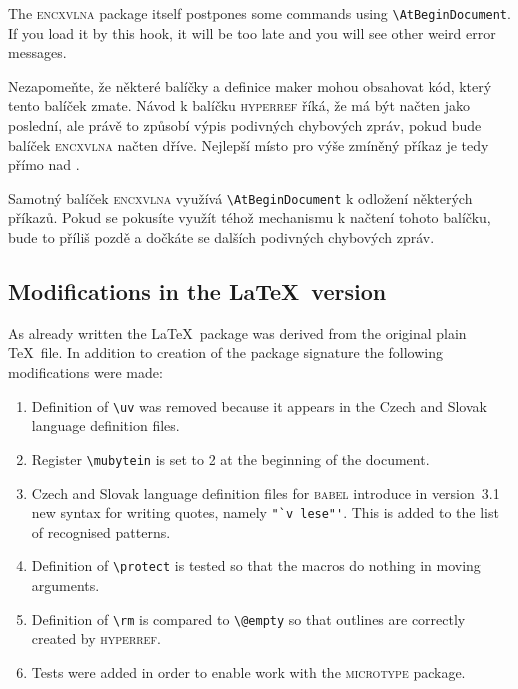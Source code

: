The \textsc{encxvlna} package itself postpones some commands using \verb;\AtBeginDocument;. If you load
it by this hook, it will be too late and you will see other weird error messages.

\else

Nezapomeňte, že některé balíčky a definice maker mohou obsahovat kód, který tento balíček zmate.
Návod k balíčku \textsc{hyperref} říká, že má být načten jako poslední, ale právě to způsobí výpis
podivných chybových zpráv, pokud bude balíček \textsc{encxvlna} načten dříve. Nejlepší místo pro výše
zmíněný příkaz je tedy přímo nad \verb;;.

Samotný balíček \textsc{encxvlna} využívá \verb;\AtBeginDocument; k odložení některých příkazů. Pokud
se pokusíte využít téhož mechanismu k načtení tohoto balíčku, bude to příliš pozdě a dočkáte se
dalších podivných chybových zpráv.

\fi


\ifeng

\subsection{Modifications in the \LaTeX\ version}
As already written the \LaTeX\ package was derived from the original plain \TeX\ file. In addition
to creation of the package signature the following modifications were made:

\begin{enumerate}
\item Definition of \verb;\uv; was removed because it appears in the Czech and Slovak language
definition files.
\item Register \verb;\mubytein; is set to 2 at the beginning of the document.
\item Czech and Slovak language definition files for \textsc{babel} introduce in version~3.1
new syntax for writing quotes, namely \verb;"`v lese"';. This is added to the list of recognised
patterns.
\item Definition of \verb;\protect; is tested so that the macros do nothing in moving arguments.
\item Definition of \verb;\rm; is compared to \verb;\@empty; so that outlines are correctly created
by \textsc{hyperref}.
\item Tests were added in order to enable work with the \textsc{microtype} package.
\end{enumerate}

